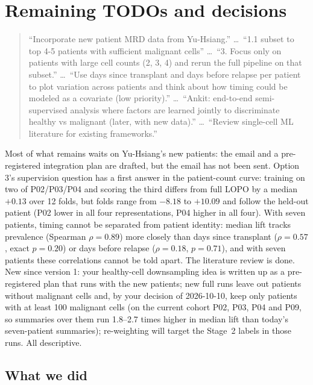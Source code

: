 \section{Remaining TODOs and decisions}
\label{sec:remaining-todos}

\begin{quote}
``Incorporate new patient MRD data from Yu-Hsiang.'' \ldots\ ``1.1 subset to top 4-5 patients with sufficient malignant cells'' \ldots\ ``3. Focus only on patients with large cell counts (2, 3, 4) and rerun the full pipeline on that subset.'' \ldots\ ``Use days since transplant and days before relapse per patient to plot variation across patients and think about how timing could be modeled as a covariate (low priority).'' \ldots\ ``Ankit: end-to-end semi-supervised analysis where factors are learned jointly to discriminate healthy vs malignant (later, with new data).'' \ldots\ ``Review single-cell ML literature for existing frameworks.''
\end{quote}

\begin{answerbox}
Most of what remains waits on Yu-Hsiang's new patients: the email and a pre-registered integration plan are drafted, but the email has not been sent. Option 3's supervision question has a first answer in the patient-count curve: training on two of P02/P03/P04 and scoring the third differs from full LOPO by a median $+0.13$\pp{} over 12 folds, but folds range from $-8.18$ to $+10.09$\pp{} and follow the held-out patient (P02 lower in all four representations, P04 higher in all four). With seven patients, timing cannot be separated from patient identity: median lift tracks prevalence (Spearman $\rho = 0.89$) more closely than days since transplant ($\rho = 0.57$, exact $p = 0.20$) or days before relapse ($\rho = 0.18$, $p = 0.71$), and with seven patients these correlations cannot be told apart. The literature review is done. New since version 1: your healthy-cell downsampling idea is written up as a pre-registered plan that runs with the new patients; new full runs leave out patients without malignant cells and, by your decision of 2026-10-10, keep only patients with at least 100 malignant cells (on the current cohort P02, P03, P04 and P09, so summaries over them run 1.8--2.7 times higher in median lift than today's seven-patient summaries); re-weighting will target the Stage~2 labels in those runs. All descriptive.
\end{answerbox}

\subsection*{What we did}

